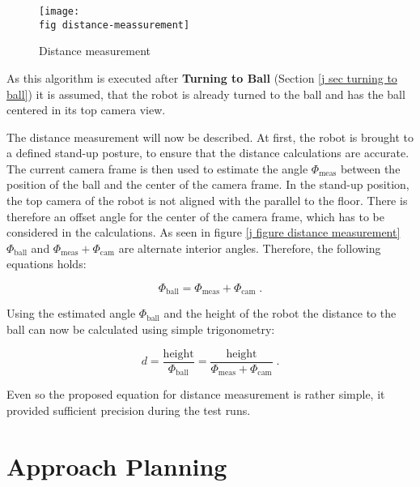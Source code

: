 \begin{figure}[ht]
  \texttt{[image: \\fig distance-meassurement]}
  \caption{Distance measurement}
  \label{j figure distance measurement}
\end{figure}

As this algorithm is executed after \textbf{Turning to Ball} (Section \ref{j
  sec turning to ball}) it is assumed, that the robot is already turned to the
ball and has the ball centered in its top camera view.

The distance measurement will now be described. At first,
the robot is brought to a defined stand-up posture, to ensure that the
distance calculations are accurate. The current camera frame is then
used to estimate the angle $\Phi_{\mathrm{meas}}$ between the position of the
ball and the center of the camera frame. In the stand-up position, the top
camera of the robot is not aligned with the parallel to the floor. There is
therefore an offset angle for the center of the camera frame, which has to be
considered in the calculations. As seen in figure \ref{j figure distance
  measurement} $ \Phi_{\mathrm{ball}} $ and $
\Phi_{\mathrm{meas}}+\Phi_{\mathrm{cam}} $ are alternate interior angles.
Therefore, the following equations holds:

\begin{equation}
  \Phi_{\mathrm{ball}} = \Phi_{\mathrm{meas}}+\Phi_{\mathrm{cam}} \; .
\end{equation}

Using the estimated angle $ \Phi_{\mathrm{ball}} $ and the height of the robot
the distance to the ball can now be calculated using simple trigonometry:

\begin{equation}
  d = \frac{\mathrm{height}}{\Phi_{\mathrm{ball}}} = \frac{\mathrm{height}}{\Phi_{\mathrm{meas}}+\Phi_{\mathrm{cam}}} \; .
\end{equation}

Even so the proposed equation for distance measurement is rather simple, it
provided sufficient precision during the test runs.


\section{Approach Planning}
\label{j sec approach planning}

